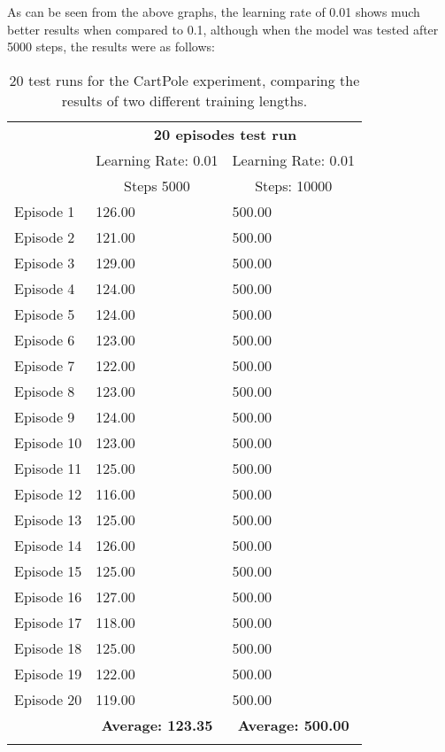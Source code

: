 As can be seen from the above graphs, the learning rate of 0.01 shows much better results when compared to 0.1, although when the model was tested after 5000 steps, the results were as follows:
\begin{table}[H]
 \caption{20 test runs for the CartPole experiment, comparing the results of two different training lengths.}

 \begin{tabular}{ |p{2.2cm}|p{3cm}|p{3cm}| }
 \cline{2-3} 
 \multicolumn{1}{c}{} & \multicolumn{2}{|c|}{ \textbf{20 episodes test run}} \\
 \cline{2-3} 
 \multicolumn{1}{c}{} & \multicolumn{1}{|c|}{Learning Rate: 0.01} & \multicolumn{1}{|c|}{Learning Rate: 0.01}\\
 \multicolumn{1}{c}{} & \multicolumn{1}{|c|}{Steps 5000} & \multicolumn{1}{|c|}{Steps: 10000}\\
 \hline
 Episode 1 & 126.00 & 500.00\\
 Episode 2 & 121.00 & 500.00\\
 Episode 3 & 129.00 & 500.00\\
 Episode 4 & 124.00 & 500.00\\
 Episode 5 & 124.00 & 500.00\\
 Episode 6 & 123.00 & 500.00\\
 Episode 7 & 122.00 & 500.00\\
 Episode 8 & 123.00 & 500.00\\
 Episode 9 & 124.00 & 500.00\\
 Episode 10 & 123.00 &500.00 \\
 Episode 11 & 125.00 &500.00 \\
 Episode 12 & 116.00 &500.00 \\
 Episode 13 & 125.00 &500.00 \\
 Episode 14 & 126.00 &500.00 \\
 Episode 15 & 125.00 &500.00 \\
 Episode 16 & 127.00 &500.00 \\
 Episode 17 & 118.00 &500.00 \\
 Episode 18 & 125.00 &500.00 \\
 Episode 19 & 122.00 &500.00 \\
 Episode 20 & 119.00 &500.00 \\
 \hline
 \multicolumn{1}{c}{} & \multicolumn{1}{|c|}{\textbf{Average: 123.35}} & \multicolumn{1}{|c|}{\textbf{Average: 500.00}} \\
 \cline{2-3}
 \multicolumn{3}{c}{} 
 \end{tabular}
\end{table}
 
